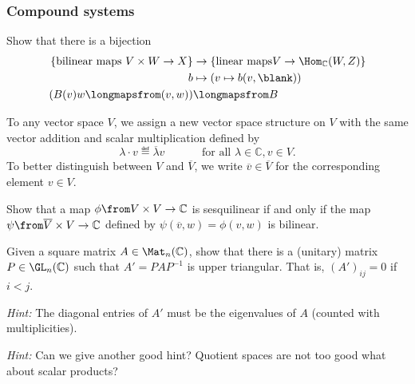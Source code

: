 \documentclass[a4paper,oneside, 12pt]{amsart}
\begin{document}
\subsubsection*{Compound systems}
\begin{exercise}\label{exe:bilinear-vs-linear-hom}
  Show that there is a bijection
  \begin{align*}
    \{\text{bilinear maps } V\times W \to X \} & \to \{\text{linear maps} V\to \Hom_{ \mathbb{C}}(W,Z) \} \\
    b & \mapsto (v\mapsto b(v, \blank)) \\
    (B(v) w \longmapsfrom (v,w)) &\longmapsfrom B
  \end{align*}
\end{exercise}


\begin{exercise}\label{exe:translating-bilinear-to-sesquilinear}
  To any vector space \( V \), we assign a new vector space structure on \(V\) with the same vector addition and scalar multiplication defined by
  \begin{equation*}
    \lambda \cdot v \eqdef \overline{\lambda}v \qquad\quad \text{ for all }\lambda \in \mathbb{C}, v\in V.
  \end{equation*}
  To better distinguish between \(V\) and \(\overline{V}\), we write \(\overline{v}\in \overline{V}\) for the corresponding element \(v\in V\).

  Show that a map \( \phi \from V \times V \to \mathbb{C} \) is sesquilinear if and only if the map \( \psi \from \overline{V} \times V \to \mathbb{C} \) defined by \( \psi(\overline{v}, w) = \phi(v, w) \) is bilinear.
\end{exercise}

\begin{exercise}\label{exe:schur-decomposition}
  Given a square matrix \(A\in \Mat_{n}( \mathbb{C})\), show that there is a (unitary) matrix \(P \in \GL_{n}( \mathbb{C})\) such that \(A'= PAP^{-1}\) is upper triangular.
  That is, \((A')_{ij} =0 \) if \(i<j\).

  \textit{Hint:} The diagonal entries of \(A'\) must be the eigenvalues of \(A\) (counted with multiplicities).

  \textit{Hint:} Can we give another good hint? Quotient spaces are not too good what about scalar products?
\end{exercise}
\end{document}
